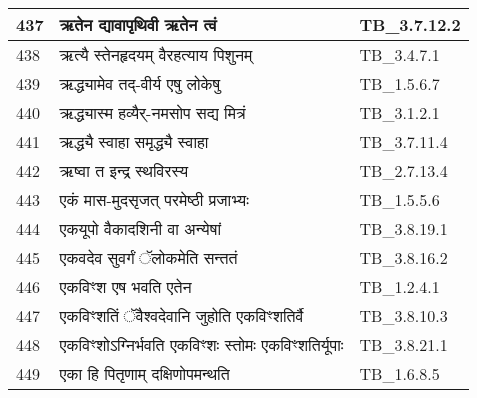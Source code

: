 \documentclass[17pt]{extarticle}
\begin{document}
\begin{longtable}{||p{0.4in}||p{4.9in}||p{0.9in}||}
    437 & ऋतेन द्यावापृथिवी ऋतेन त्वं & TB\_3.7.12.2       \\
    
    \hline
        
    438 & ऋत्यै स्तेनहृदयम् वैरहत्याय पिशुनम् & TB\_3.4.7.1       \\
    
    \hline
        
    439 & ऋद्ध्यामेव तद्{-}वीर्य एषु लोकेषु & TB\_1.5.6.7       \\
    
    \hline
        
    440 & ऋद्ध्यास्म हव्यैर्{-}नमसोप सद्य मित्रं & TB\_3.1.2.1       \\
    
    \hline
        
    441 & ऋद्ध्यै स्वाहा समृद्ध्यै स्वाहा & TB\_3.7.11.4       \\
    
    \hline
        
    442 & ऋष्वा त इन्द्र स्थविरस्य & TB\_2.7.13.4       \\
    
    \hline
        
    443 & एकं मास{-}मुदसृजत् परमेष्ठी प्रजाभ्यः & TB\_1.5.5.6       \\
    
    \hline
        
    444 & एकयूपो वैकादशिनी वा अन्येषां & TB\_3.8.19.1       \\
    
    \hline
        
    445 & एकवदेव सुवर्गं ॅलोकमेति सन्ततं & TB\_3.8.16.2       \\
    
    \hline
        
    446 & एकविꣳश एष भवति एतेन & TB\_1.2.4.1       \\
    
    \hline
        
    447 & एकविꣳशतिं ॅवैश्वदेवानि जुहोति एकविꣳशतिर्वै & TB\_3.8.10.3       \\
    
    \hline
        
    448 & एकविꣳशोऽग्निर्भवति एकविꣳशः स्तोमः एकविꣳशतिर्यूपाः & TB\_3.8.21.1       \\
    
    \hline
        
    449 & एका हि पितृणाम् दक्षिणोपमन्थति & TB\_1.6.8.5       \\
    

\end{longtable}
\end{document}
